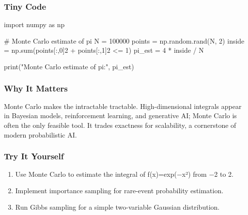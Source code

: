 \documentclass[
  letterpaper,
  DIV=11,
  numbers=noendperiod]{scrreprt}
\newenvironment{Shaded}{\begin{snugshade}}{\end{snugshade}}
\newcommand{\BuiltInTok}[1]{\textcolor[rgb]{0.00,0.23,0.31}{#1}}
\newcommand{\CommentTok}[1]{\textcolor[rgb]{0.37,0.37,0.37}{#1}}
\newcommand{\DecValTok}[1]{\textcolor[rgb]{0.68,0.00,0.00}{#1}}
\newcommand{\ImportTok}[1]{\textcolor[rgb]{0.00,0.46,0.62}{#1}}
\newcommand{\NormalTok}[1]{\textcolor[rgb]{0.00,0.23,0.31}{#1}}
\newcommand{\OperatorTok}[1]{\textcolor[rgb]{0.37,0.37,0.37}{#1}}
\newcommand{\StringTok}[1]{\textcolor[rgb]{0.13,0.47,0.30}{#1}}
\providecommand{\tightlist}{%
  \setlength{\itemsep}{0pt}\setlength{\parskip}{0pt}}
\begin{document}
\subsubsection{Tiny Code}\label{tiny-code-157}

\begin{Shaded}
\begin{Highlighting}[]
\ImportTok{import}\NormalTok{ numpy }\ImportTok{as}\NormalTok{ np}

\CommentTok{\# Monte Carlo estimate of pi}
\NormalTok{N }\OperatorTok{=} \DecValTok{100000}
\NormalTok{points }\OperatorTok{=}\NormalTok{ np.random.rand(N, }\DecValTok{2}\NormalTok{)}
\NormalTok{inside }\OperatorTok{=}\NormalTok{ np.}\BuiltInTok{sum}\NormalTok{(points[:,}\DecValTok{0}\NormalTok{]}\DecValTok{2} \OperatorTok{+}\NormalTok{ points[:,}\DecValTok{1}\NormalTok{]}\DecValTok{2} \OperatorTok{\textless{}=} \DecValTok{1}\NormalTok{)}
\NormalTok{pi\_est }\OperatorTok{=} \DecValTok{4} \OperatorTok{*}\NormalTok{ inside }\OperatorTok{/}\NormalTok{ N}

\BuiltInTok{print}\NormalTok{(}\StringTok{"Monte Carlo estimate of pi:"}\NormalTok{, pi\_est)}
\end{Highlighting}
\end{Shaded}

\subsubsection{Why It Matters}\label{why-it-matters-55}

Monte Carlo makes the intractable tractable. High-dimensional integrals
appear in Bayesian models, reinforcement learning, and generative AI;
Monte Carlo is often the only feasible tool. It trades exactness for
scalability, a cornerstone of modern probabilistic AI.

\subsubsection{Try It Yourself}\label{try-it-yourself-157}

\begin{enumerate}
\def\labelenumi{\arabic{enumi}.}
\tightlist
\item
  Use Monte Carlo to estimate the integral of f(x)=exp(−x²) from −2 to
  2.
\item
  Implement importance sampling for rare-event probability estimation.
\item
  Run Gibbs sampling for a simple two-variable Gaussian distribution.
\end{enumerate}
\end{document}
